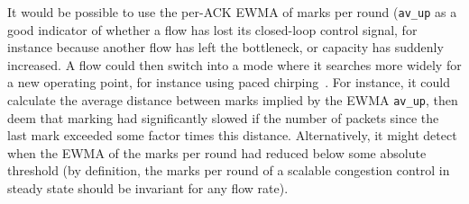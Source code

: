 It would be possible to use the per-ACK EWMA of marks per round (\texttt{av\_up} as a good indicator of whether a flow has lost its closed-loop control signal, for instance because another flow has left the bottleneck, or capacity has suddenly increased. A flow could then switch into a mode where it searches more widely for a new operating point, for instance using paced chirping~\cite[\S\,3]{Misund19a:Paced_Chirping_Linux}. For instance, it could calculate the average distance between marks implied by the EWMA \texttt{av\_up}, then deem that marking had significantly slowed if the number of packets since the last mark exceeded some factor times this distance. Alternatively, it might detect when the EWMA of the marks per round had reduced below some absolute threshold (by definition, the marks per round of a scalable congestion control in steady state should be invariant for any flow rate).
